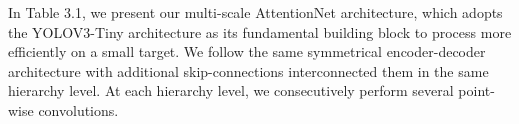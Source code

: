 In Table 3.1, we present our multi-scale AttentionNet architecture, which adopts the YOLOV3-Tiny architecture as its fundamental building block to process more efficiently on a small target. We follow the same
symmetrical encoder-decoder architecture with additional skip-connections interconnected them in the same hierarchy level. At each hierarchy level, we consecutively perform several point-wise convolutions. 

\begin{table}[h]
\centering

\end{table}
